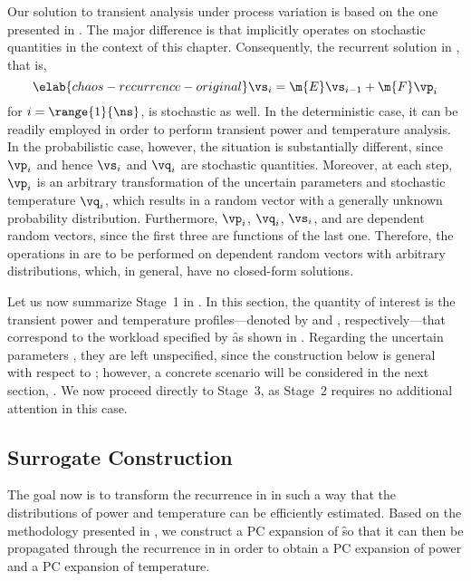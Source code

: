 Our solution to transient analysis under process variation is based on the one
presented in . The major difference is that
 implicitly operates on stochastic quantities in the
context of this chapter. Consequently, the recurrent solution in
, that is,
\begin{equation} \elab{chaos-recurrence-original}
  \vs_i = \m{E} \vs_{i - 1} + \m{F} \vp_i
\end{equation}
for $i = \range{1}{\ns}$, is stochastic as well. In the deterministic case, it
can be readily employed in order to perform transient power and temperature
analysis. In the probabilistic case, however, the situation is substantially
different, since $\vp_i$ and hence $\vs_i$ and $\vq_i$ are stochastic
quantities. Moreover, at each step, $\vp_i$ is an arbitrary transformation of
the uncertain parameters \vu and stochastic temperature $\vq_i$, which results
in a random vector with a generally unknown probability distribution.
Furthermore, $\vp_i$, $\vq_i$, $\vs_i$, and \vu are dependent random vectors,
since the first three are functions of the last one. Therefore, the operations
in  are to be performed on dependent random
vectors with arbitrary distributions, which, in general, have no closed-form
solutions.

Let us now summarize Stage~1 in . In this section, the
quantity of interest \g is the transient power and temperature
profiles---denoted by \mp and \mq, respectively---that correspond to the
workload specified by \f as shown in . Regarding the
uncertain parameters \vu, they are left unspecified, since the construction
below is general with respect to \vu; however, a concrete scenario will be
considered in the next section, . We now
proceed directly to Stage~3, as Stage~2 requires no additional attention in this
case.

\subsection{Surrogate Construction}

The goal now is to transform the recurrence in 
in such a way that the distributions of power and temperature can be efficiently
estimated. Based on the methodology presented in
, we construct a \ac{PC} expansion of \f so
that it can then be propagated through the recurrence in
 in order to obtain a \ac{PC} expansion of power
and a \ac{PC} expansion of temperature.

